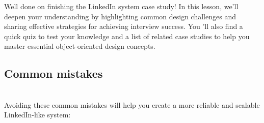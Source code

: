 

Well done on finishing the LinkedIn system case study! In this lesson, we'll deepen your understanding by highlighting common design challenges and sharing effective strategies for achieving interview success. You 'll also find a quick quiz to test your knowledge and a list of related case studies to help you master essential object-oriented design concepts.

\subsection{Common mistakes}\label{UdQnDp0UKJg4yiLpKooU3}
\\
Avoiding these common mistakes will help you create a more reliable and scalable LinkedIn-like system:

